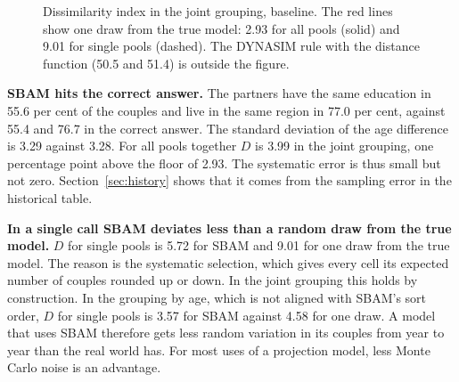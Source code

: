 \documentclass[12pt,a4paper]{article}
\begin{document}
\begin{figure}[H]
\centering
{}
\caption{Dissimilarity index in the joint grouping, baseline. The red lines show one draw from the
true model: 2.93 for all pools (solid) and 9.01 for single pools (dashed). The DYNASIM rule with
the distance function (50.5 and 51.4) is outside the figure.}
\label{fig:djoint}
\end{figure}

\textbf{SBAM hits the correct answer.} The partners have the same education in 55.6 per cent of
the couples and live in the same region in 77.0 per cent, against 55.4 and 76.7 in the correct
answer. The standard deviation of the age difference is 3.29 against 3.28. For all pools together
$D$ is 3.99 in the joint grouping, one percentage point above the floor of 2.93. The systematic
error is thus small but not zero. Section~\ref{sec:history} shows that it comes from the
sampling error in the historical table.

\textbf{In a single call SBAM deviates less than a random draw from the true model.} $D$ for
single pools is 5.72 for SBAM and 9.01 for one draw from the true model. The reason is the
systematic selection, which gives every cell its expected number of couples rounded up or down.
In the joint grouping this holds by construction. In the grouping by age, which is not aligned
with SBAM's sort order, $D$ for single pools is 3.57 for SBAM against 4.58 for one draw. A model
that uses SBAM therefore gets less random variation in its couples from year to year than the
real world has. For most uses of a projection model, less Monte Carlo noise is an advantage.
\end{document}
